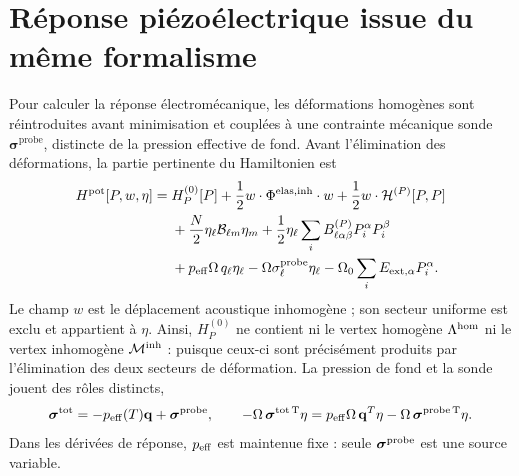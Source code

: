 \section{Réponse piézoélectrique issue du même formalisme}
\label{sec:piezoelectric_response_fr}

Pour calculer la réponse électromécanique, les déformations homogènes sont
réintroduites avant minimisation et couplées à une contrainte mécanique sonde
$\boldsymbol\sigma^{\mathrm{probe}}$, distincte de la pression effective de
fond. Avant l'élimination des déformations, la partie pertinente du Hamiltonien
est
\begin{equation}
\begin{aligned}
H^{\rm pot}[P,w,\eta]={}&H_P^{(0)}[P]
+\frac12w\mathbin{\cdot}\Phi^{\rm elas,inh}\mathbin{\cdot}w
+\frac12w\mathbin{\cdot}\mathcal H^{(P)}[P,P]\\
&+\frac N2\eta_\ell\mathcal B_{\ell m}\eta_m
+\frac12\eta_\ell\sum_iB^{(P)}_{\ell\alpha\beta}
P_i^\alpha P_i^\beta\\
&+p_{\rm eff}\Omega\,q_\ell\eta_\ell
-\Omega\sigma_\ell^{\rm probe}\eta_\ell
-\Omega_0\sum_iE_{{\rm ext},\alpha}P_i^\alpha .
\end{aligned}
\label{eq:core_piezo_pre_elimination_hamiltonian}
\end{equation}
Le champ $w$ est le déplacement acoustique inhomogène ; son secteur uniforme
est exclu et appartient à $\eta$. Ainsi, $H_P^{(0)}$ ne contient ni le vertex
homogène $\Lambda^{\rm hom}$ ni le vertex inhomogène
$\mathcal M^{\rm inh}$ : puisque ceux-ci sont précisément produits par l'élimination
des deux secteurs de déformation. La pression de fond et la sonde jouent des
rôles distincts,
\begin{equation}
\boldsymbol\sigma^{\rm tot}
=-p_{\rm eff}(T)\mathbf q+\boldsymbol\sigma^{\rm probe},
\qquad
-\Omega\,\boldsymbol\sigma^{\rm tot\,T}\eta
=p_{\rm eff}\Omega\,\mathbf q^T\eta
-\Omega\,\boldsymbol\sigma^{\rm probe\,T}\eta .
\label{eq:core_piezo_stress_split}
\end{equation}
Dans les dérivées de réponse, $p_{\rm eff}$ est maintenue fixe : seule
$\boldsymbol\sigma^{\rm probe}$ est une source variable.

